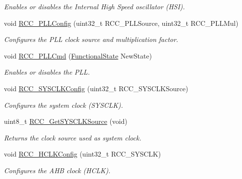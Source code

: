 \begin{DoxyCompactItemize}
\begin{DoxyCompactList}\small\item\em Enables or disables the Internal High Speed oscillator (H\+SI). \end{DoxyCompactList}\item 
void \mbox{\hyperlink{group___r_c_c___private___functions_ga0f67634cbe721f2c42f022d2a93229c8}{R\+C\+C\+\_\+\+P\+L\+L\+Config}} (uint32\+\_\+t R\+C\+C\+\_\+\+P\+L\+L\+Source, uint32\+\_\+t R\+C\+C\+\_\+\+P\+L\+L\+Mul)
\begin{DoxyCompactList}\small\item\em Configures the P\+LL clock source and multiplication factor. \end{DoxyCompactList}\item 
void \mbox{\hyperlink{group___r_c_c___private___functions_ga84dee53c75e58fdb53571716593c2272}{R\+C\+C\+\_\+\+P\+L\+L\+Cmd}} (\mbox{\hyperlink{group___exported__types_gac9a7e9a35d2513ec15c3b537aaa4fba1}{Functional\+State}} New\+State)
\begin{DoxyCompactList}\small\item\em Enables or disables the P\+LL. \end{DoxyCompactList}\item 
void \mbox{\hyperlink{group___r_c_c___private___functions_ga3551a36a8f0a3dc96a74d6b939048337}{R\+C\+C\+\_\+\+S\+Y\+S\+C\+L\+K\+Config}} (uint32\+\_\+t R\+C\+C\+\_\+\+S\+Y\+S\+C\+L\+K\+Source)
\begin{DoxyCompactList}\small\item\em Configures the system clock (S\+Y\+S\+C\+LK). \end{DoxyCompactList}\item 
uint8\+\_\+t \mbox{\hyperlink{group___r_c_c___private___functions_gaaeb32311c208b2a980841c9c884a41ea}{R\+C\+C\+\_\+\+Get\+S\+Y\+S\+C\+L\+K\+Source}} (void)
\begin{DoxyCompactList}\small\item\em Returns the clock source used as system clock. \end{DoxyCompactList}\item 
void \mbox{\hyperlink{group___r_c_c___private___functions_ga9d0aec72e236c6cdf3a3a82dfb525491}{R\+C\+C\+\_\+\+H\+C\+L\+K\+Config}} (uint32\+\_\+t R\+C\+C\+\_\+\+S\+Y\+S\+C\+LK)
\begin{DoxyCompactList}\small\item\em Configures the A\+HB clock (H\+C\+LK). \end{DoxyCompactList}\item 

\end{DoxyCompactItemize}
